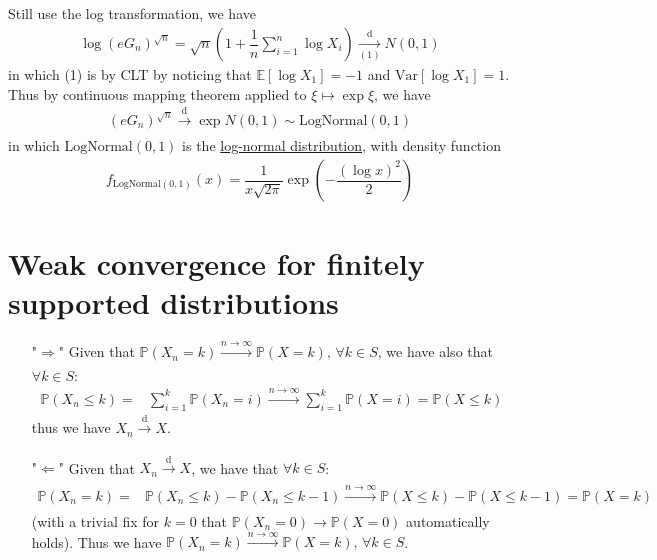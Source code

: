 \documentclass[11pt,a4paper]{article}
\numberwithin{equation}{section}%
\begin{document}
\subsection{}
Still use the log transformation, we have
\begin{align*}
    \log (eG_n)^{\sqrt{n}} = \sqrt{n}\left( 1+\dfrac{ 1 }{ n }\sum_{i=1}^n \log X_i \right) \xrightarrow[(1)]{\mathrm{d}} N(0,1)
\end{align*}
in which (1) is by CLT by noticing that $ \mathbb{E}\left[ \log X_1 \right] =-1 $ and $ \mathrm{Var}\left[ \log X_1 \right] =1 $. Thus by continuous mapping theorem applied to $ \xi \mapsto \exp \xi  $, we have
\begin{align*}
    (eG_n)^{\sqrt{n}} \xrightarrow[]{\mathrm{d}} \exp N(0,1) \sim \mathrm{ LogNormal }(0,1) 
\end{align*}
in which $ \mathrm{ LogNormal }(0,1)  $ is the \href{https://en.wikipedia.org/wiki/Log-normal_distribution}{log-normal distribution}, with density function
\begin{align*}
    f_\mathrm{ LogNormal(0,1) }(x) = \dfrac{ 1 }{ x\sqrt{2\pi} }\exp\left( -\dfrac{ (\log x)^2 }{ 2 } \right)
\end{align*}

\section{Weak convergence for finitely supported distributions}

\begin{itemize}[topsep=2pt,itemsep=0pt]
    \item["$  \Rightarrow  $"] Given that $ \mathbb{P}\left( X_n=k \right)\xrightarrow[]{n\to\infty} \mathbb{P}\left( X=k \right),\,\forall k\in S  $, we have also that $ \forall k\in S $:
    \begin{align*}
        \mathbb{P}\left( X_n\leq k \right) = & \sum_{i=1}^k \mathbb{P}\left( X_n=i \right) \xrightarrow[]{n\to\infty} \sum_{i=1}^k \mathbb{P}\left( X=i \right) = \mathbb{P}\left( X\leq k \right) 
    \end{align*}
    thus we have $ X_n\xrightarrow[]{\mathrm{d}}  X $.
    \item["$  \Leftarrow  $"] Given that $ X_n\xrightarrow[]{\mathrm{d}}  X $, we have that $ \forall k\in S $:
    \begin{align*}
        \mathbb{P}\left( X_n=k \right) = & \mathbb{P}\left( X_n\leq k \right) - \mathbb{P}\left( X_n\leq k-1 \right) \xrightarrow[]{n\to\infty} \mathbb{P}\left( X\leq k \right) - \mathbb{P}\left( X\leq k-1 \right) = \mathbb{P}\left( X=k \right)
    \end{align*}
    (with a trivial fix for $ k=0 $ that $ \mathbb{P}\left( X_n=0 \right)\to\mathbb{P}\left( X=0 \right)  $ automatically holds). Thus we have $ \mathbb{P}\left( X_n=k \right)\xrightarrow[]{n\to\infty} \mathbb{P}\left( X=k \right),\,\forall k\in S  $.

\end{itemize}
\end{document}
